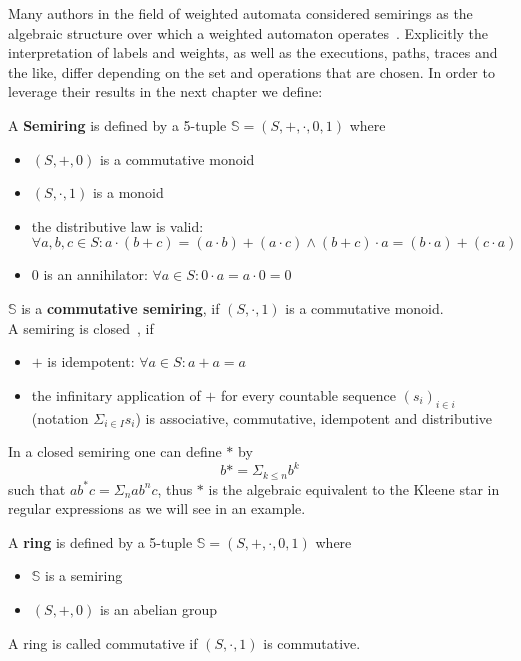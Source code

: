             Many authors in the field of weighted automata considered semirings as the algebraic structure over which a weighted automaton operates~\autocite{HWA, WA}. Explicitly the interpretation of labels and weights, as well as the executions, paths, traces and the like, differ depending on the set and operations that are chosen. In order to leverage their results in the next chapter we define:
            \begin{definition}[Semiring]
                A \textbf{Semiring} is defined by a 5-tuple $\mathbb{S} = (S, +, \cdot, 0, 1)$ where
                \begin{itemize}
                 \item $(S, +, 0)$ is a commutative monoid
                 \item $(S, \cdot, 1)$ is a monoid
                 \item the distributive law is valid: $\forall a,b,c \in S: a \cdot (b + c) = (a \cdot b) + (a \cdot c) \wedge (b + c) \cdot a = (b \cdot a) + (c \cdot a)$
                 \item $0$ is an annihilator: $\forall a \in S: 0 \cdot a = a \cdot 0 = 0$
                \end{itemize}
                $\mathbb{S}$ is a \textbf{commutative semiring}, if $(S, \cdot, 1)$ is a commutative monoid. \\
                
                A semiring is closed~\autocite{CS}, if
                \begin{itemize}
                 \item $+$ is idempotent: $\forall a \in S: a + a = a$
                 \item the infinitary application of $+$ for every countable sequence $(s_i)_{i \in i}$ (notation $\Sigma_{i \in I} s_i$) is associative, commutative, idempotent and distributive
                \end{itemize}
                In a closed semiring one can define $*$ by~\autocite{CS} 
                \[ b* = \Sigma_{k \leq n} b^k \]
                such that $ab^* c = \Sigma_n ab^n c$, thus $*$ is the algebraic equivalent to the Kleene star in regular expressions as we will see in an example.
            \end{definition}
                
            
            \begin{definition}[Ring]
            A \textbf{ring} is defined by a 5-tuple $\mathbb{S} = (S, +, \cdot, 0, 1)$ where
            \begin{itemize}
             \item $\mathbb{S}$ is a semiring 
             \item $(S, +, 0)$ is an abelian group
            \end{itemize}
                A ring is called commutative if  $(S, \cdot, 1)$ is commutative.
            \end{definition}
            

